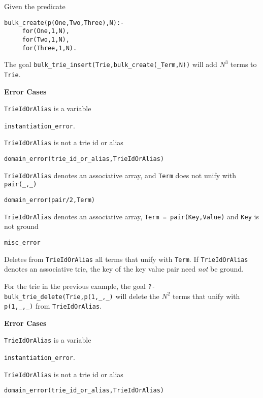\begin{description}
\begin{example} \rm
Given the predicate 
\begin{verbatim}
bulk_create(p(One,Two,Three),N):- 
     for(One,1,N),
     for(Two,1,N),
     for(Three,1,N).
\end{verbatim}
The goal {\tt bulk\_trie\_insert(Trie,bulk\_create(\_Term,N))} will
add $N^3$ terms to {\tt Trie}.
\end{example}

{\bf Error Cases}
\bi
\item 	{\tt TrieIdOrAlias} is a variable
\bi
\item 	{\tt instantiation\_error}.
\ei
\item 	{\tt TrieIdOrAlias} is not a trie id or alias
\bi
\item 	{\tt domain\_error(trie\_id\_or\_alias,TrieIdOrAlias)}
\ei
\item 	{\tt TrieIdOrAlias} denotes an associative array, and {\tt Term} 
  does not unify with {\tt pair(\_,\_)} 
\bi
\item 	{\tt domain\_error(pair/2,Term)}
\ei
\item 	{\tt TrieIdOrAlias} denotes an associative array, 
  {\tt Term = pair(Key,Value)} and {\tt Key} is not ground 
\bi
\item 	{\tt misc\_error}
\ei
\ei

% 
Deletes from {\tt TrieIdOrAlias} all terms that unify with {\tt Term}.
If {\tt TrieIdOrAlias} denotes an associative trie, the key of the key
value pair need {\em not} be ground.

\begin{example} \rm
For the trie in the previous example, the goal {\tt ?-
  bulk\_trie\_delete(Trie,p(1,\_,\_)} will delete the $N^2$ terms that
unify with {\tt p(1,\_,\_)} from {\tt TrieIdOrAlias}.
\end{example}

{\bf Error Cases}
\bi
\item 	{\tt TrieIdOrAlias} is a variable
\bi
\item 	{\tt instantiation\_error}.
\ei
\item 	{\tt TrieIdOrAlias} is not a trie id or alias
\bi
\item 	{\tt domain\_error(trie\_id\_or\_alias,TrieIdOrAlias)}
\ei
\ei

%
\end{description}

